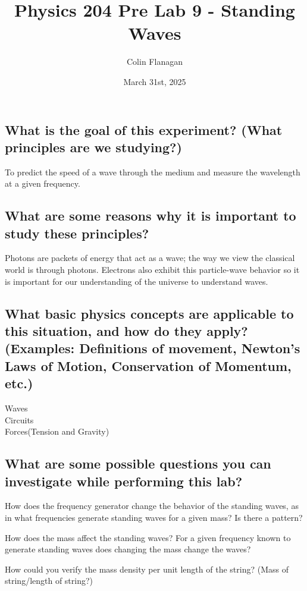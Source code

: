 \documentclass{article}
\title{Physics 204 Pre Lab 9 - Standing Waves}
\author{Colin Flanagan}
\date{March 31st, 2025}
\begin{document}
\maketitle

\subsection*{What is the goal of this experiment? (What principles are we studying?)}

    To predict the speed of a wave through the medium and measure the wavelength at a given frequency. 

\subsection*{What are some reasons why it is important to study these principles?
}

  Photons are packets of energy that act as a wave; the way we view the classical world is through photons. Electrons also exhibit this particle-wave behavior so it is important for our understanding of the universe to understand waves.
    
\subsection*{What basic physics concepts are applicable to this situation, and how do they apply? (Examples: Definitions of movement, Newton’s Laws of Motion, Conservation of Momentum, etc.)}

    Waves\\

    Circuits\\

    Forces(Tension and Gravity)\\

\subsection*{What are some possible questions you can investigate while performing this lab?
}

   How does the frequency generator change the behavior of the standing waves, as in what frequencies generate standing waves for a given mass? Is there a pattern?

   How does the mass affect the standing waves? For a given frequency known to generate standing waves does changing the mass change the waves?

   How could you verify the mass density per unit length of the string? (Mass of string/length of string?)
\end{document}
